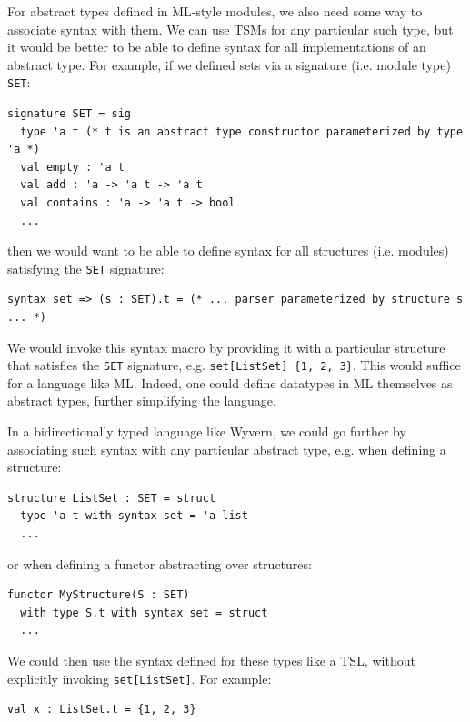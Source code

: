 \begin{contribution} \label{cont:abstype-syntax}
For abstract types defined in ML-style modules, we also need some way to associate syntax with them. We can use TSMs for any particular such type, but it would be better to be able to define syntax for all implementations of an abstract type. For example, if we defined sets via a signature (i.e. module type) \lstinline{SET}:

\begin{lstlisting}[numbers=none]
signature SET = sig
  type 'a t (* t is an abstract type constructor parameterized by type 'a *)
  val empty : 'a t
  val add : 'a -> 'a t -> 'a t
  val contains : 'a -> 'a t -> bool
  ...
\end{lstlisting}
then we would want to be able to define syntax for all structures (i.e. modules) satisfying the \lstinline{SET} signature:
\begin{lstlisting}[numbers=none]
syntax set => (s : SET).t = (* ... parser parameterized by structure s ... *)
\end{lstlisting}

We would invoke this syntax macro by providing it with a particular structure that satisfies the \verb|SET| signature, e.g. \verb|set[ListSet] {1, 2, 3}|. This would suffice for a language like ML. Indeed, one could define datatypes in ML themselves as abstract types, further simplifying the language.

In a bidirectionally typed language like Wyvern, we could go further by associating such syntax with any particular abstract type, e.g. when defining a structure:

\begin{lstlisting}[numbers=none]
structure ListSet : SET = struct 
  type 'a t with syntax set = 'a list
  ...
\end{lstlisting}
or when defining a functor abstracting over structures:
\begin{lstlisting}[numbers=none]
functor MyStructure(S : SET) 
  with type S.t with syntax set = struct
  ...
\end{lstlisting}
We could then use the syntax defined for these types like a TSL, without explicitly invoking \lstinline{set[ListSet]}. For example:

\begin{lstlisting}[numbers=none]
val x : ListSet.t = {1, 2, 3}
\end{lstlisting}
\end{contribution}



